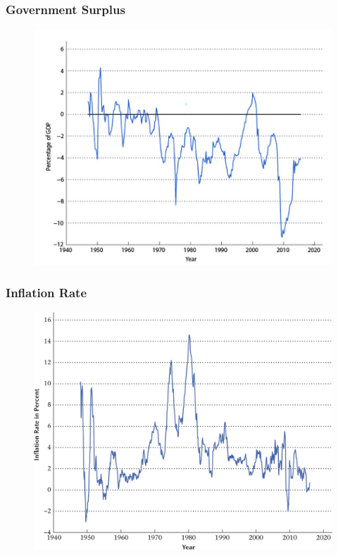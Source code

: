 \documentclass{beamer}
\begin{document}
\begin{frame}
\frametitle[alignment=center]{Government Surplus}
\begin{figure}
\includegraphics[scale=0.6]{Figures/W_Fig_1pt9.png}
\end{figure}
\end{frame}

\begin{frame}
\frametitle[alignment=center]{Inflation Rate}
\begin{figure}
\includegraphics[scale=0.3]{Figures/W_Fig_1pt10.png}
\end{figure}
\end{frame}
\end{document}
